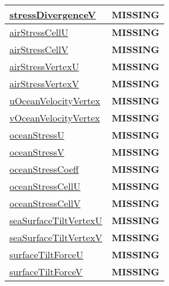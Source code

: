 {\begin{center}
\begin{longtable}{| p{2.0in} | p{4.0in} |}
    \hline
    \hyperref[subsec:var_sec_velocity_solver_stressDivergenceV]{stressDivergenceV} & {\bf \color{red} MISSING} \\
    \hline
    \hyperref[subsec:var_sec_velocity_solver_airStressCellU]{airStressCellU} & {\bf \color{red} MISSING} \\
    \hline
    \hyperref[subsec:var_sec_velocity_solver_airStressCellV]{airStressCellV} & {\bf \color{red} MISSING} \\
    \hline
    \hyperref[subsec:var_sec_velocity_solver_airStressVertexU]{airStressVertexU} & {\bf \color{red} MISSING} \\
    \hline
    \hyperref[subsec:var_sec_velocity_solver_airStressVertexV]{airStressVertexV} & {\bf \color{red} MISSING} \\
    \hline
    \hyperref[subsec:var_sec_velocity_solver_uOceanVelocityVertex]{uOceanVelocityVertex} & {\bf \color{red} MISSING} \\
    \hline
    \hyperref[subsec:var_sec_velocity_solver_vOceanVelocityVertex]{vOceanVelocityVertex} & {\bf \color{red} MISSING} \\
    \hline
    \hyperref[subsec:var_sec_velocity_solver_oceanStressU]{oceanStressU} & {\bf \color{red} MISSING} \\
    \hline
    \hyperref[subsec:var_sec_velocity_solver_oceanStressV]{oceanStressV} & {\bf \color{red} MISSING} \\
    \hline
    \hyperref[subsec:var_sec_velocity_solver_oceanStressCoeff]{oceanStressCoeff} & {\bf \color{red} MISSING} \\
    \hline
    \hyperref[subsec:var_sec_velocity_solver_oceanStressCellU]{oceanStressCellU} & {\bf \color{red} MISSING} \\
    \hline
    \hyperref[subsec:var_sec_velocity_solver_oceanStressCellV]{oceanStressCellV} & {\bf \color{red} MISSING} \\
    \hline
    \hyperref[subsec:var_sec_velocity_solver_seaSurfaceTiltVertexU]{seaSurfaceTiltVertexU} & {\bf \color{red} MISSING} \\
    \hline
    \hyperref[subsec:var_sec_velocity_solver_seaSurfaceTiltVertexV]{seaSurfaceTiltVertexV} & {\bf \color{red} MISSING} \\
    \hline
    \hyperref[subsec:var_sec_velocity_solver_surfaceTiltForceU]{surfaceTiltForceU} & {\bf \color{red} MISSING} \\
    \hline
    \hyperref[subsec:var_sec_velocity_solver_surfaceTiltForceV]{surfaceTiltForceV} & {\bf \color{red} MISSING} \\

\end{longtable}
\end{center}}
